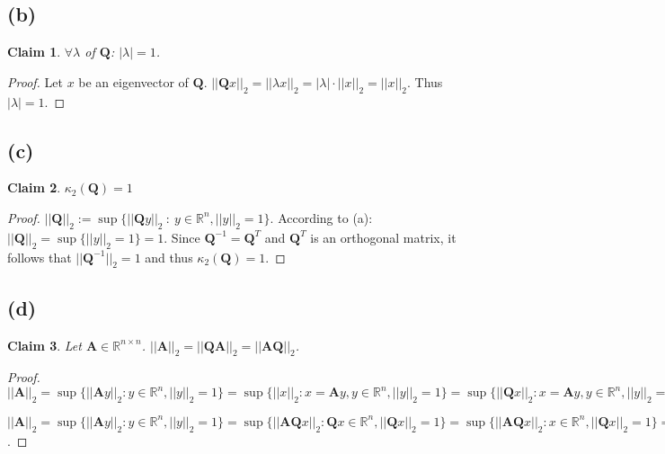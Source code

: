 \documentclass{article}
\newcommand{\norm}[1]{||#1||}
\newtheorem{claim}{Claim}
\begin{document}
	\subsection*{(b)}
		\begin{claim}
			$\forall \lambda$ of $\pmb Q$: $|\lambda|=1$.
		\end{claim}
		\begin{proof}
			Let $x$ be an eigenvector of $\pmb Q$. $\norm{\pmb Qx}_{2} = \norm{\lambda x}_{2} = |\lambda|\cdot\norm{x}_{2}= \norm{x}_{2}$. Thus $|\lambda|=1$.		
		\end{proof}
	\subsection*{(c)}
		\begin{claim}
			$\kappa_{2}(\pmb Q) = 1$
		\end{claim}
		\begin{proof}
			$\norm{\pmb Q}_{2} := \sup\{\norm{\pmb Qy}_{2}\ :\ y\in \mathbb{R}^{n},\norm{y}_{2}=1\}$. According to (a): $\norm{\pmb Q}_{2}= \sup\{\norm{y}_{2}=1\}=1$. Since $\pmb Q^{-1}=\pmb Q^{T}$ and $\pmb Q^{T}$ is an orthogonal matrix, it follows that $\norm{\pmb Q^{-1}}_{2}=1$ and thus $\kappa_{2}(\pmb Q)=1$.
		\end{proof}
	\subsection*{(d)}
		\begin{claim}
			Let $\pmb A \in \mathbb{R}^{n\times n}$. $\norm{\pmb A}_{2} = \norm{\pmb Q\pmb A}_{2} = \norm{\pmb A\pmb Q}_{2}$.
		\end{claim}
		\begin{proof}
			$\norm{\pmb A}_{2} = \sup\{\norm{\pmb Ay}_{2}:y\in \mathbb{R}^{n},\norm{y}_{2}=1\} = \sup\{\norm{x}_{2}: x=\pmb Ay, y\in\mathbb{R}^{n},\norm{y}_{2}=1\}= \sup\{\norm{\pmb Qx}_{2}: x=\pmb Ay, y\in\mathbb{R}^{n},\norm{y}_{2}=1\} = \sup\{\norm{\pmb Q\pmb A y}_{2}: y\in\mathbb{R}^{n},\norm{y}_{2}=1\} = \norm{\pmb Q\pmb A}_{2}$
			
			$\norm{\pmb A}_{2} = \sup\{\norm{\pmb Ay}_{2}:y\in \mathbb{R}^{n}, \norm{y}_{2}=1\} = \sup\{\norm{\pmb A\pmb Q x}_{2}: \pmb Qx\in \mathbb{R}^{n}, \norm{\pmb Qx}_{2}=1\} = \sup\{\norm{\pmb A\pmb Q x}_{2}: x\in \mathbb{R}^{n}, \norm{\pmb Q x}_{2}=1\}=\sup\{\norm{\pmb A \pmb Q x}_{2}: x\in \mathbb{R}^{n},\norm{x}_{2}=1\}=\norm{\pmb A \pmb Q}_{2}$.
		\end{proof}	
\end{document}
